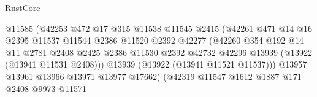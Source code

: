 \begin{lexlean}{RustCore}
\begin{coremodule}
                                          @11585
                                          (@42253
                                            @472
                                            @17
                                            @315
                                            @11538
                                            @11545
                                            @2415
                                            (@42261
                                              @471
                                              @14
                                              @16
                                              @2395
                                              @11537
                                              @11544
                                              @2386
                                              @11520
                                              @2392
                                              @42277
                                              (@42260
                                                @354
                                                @192
                                                @14
                                                @11
                                                @2781
                                                @2408
                                                @2425
                                                @2386
                                                @11530
                                                @2392
                                                @42732
                                                @42296
                                                @13939
                                                (@13922 (@13941 @11531 @2408)))
                                              @13939
                                              (@13922 (@13941 @11521 @11537)))
                                            @13957
                                            @13961
                                            @13966
                                            @13971
                                            @13977
                                            @17662)
                                          (@42319
                                            @11547
                                            @1612
                                            @1887
                                            @171
                                            @2408
                                            @9973
                                            @11571

\end{coremodule}
\end{lexlean}
